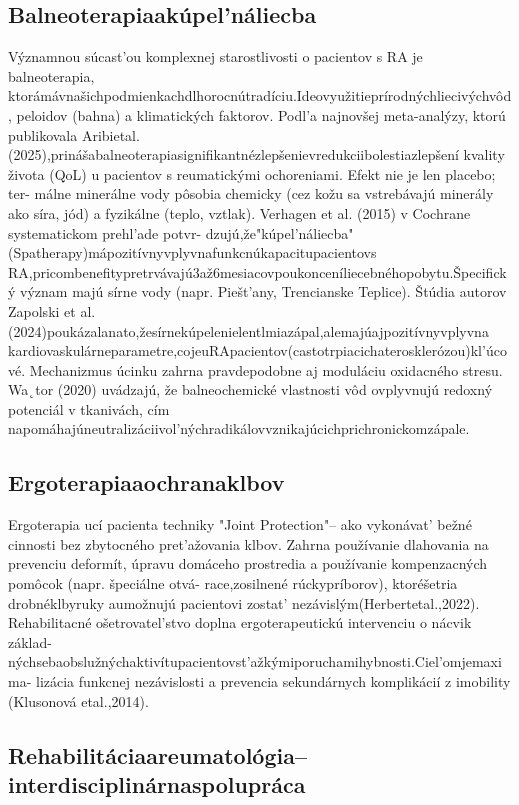 \subsection{Balneoterapiaakúpel’náliecba}

Významnou súcast’ou komplexnej starostlivosti o pacientov s RA je balneoterapia, ktorámávnašichpodmienkachdlhorocnútradíciu.Ideovyužitieprírodnýchliecivýchvôd, peloidov (bahna) a klimatických faktorov. Podl’a najnovšej meta-analýzy, ktorú publikovala Aribietal.(2025),prinášabalneoterapiasignifikantnézlepšenievredukciibolestiazlepšení kvality života (QoL) u pacientov s reumatickými ochoreniami. Efekt nie je len placebo; ter- málne minerálne vody pôsobia chemicky (cez kožu sa vstrebávajú minerály ako síra, jód) a fyzikálne (teplo, vztlak). Verhagen et al. (2015) v Cochrane systematickom prehl’ade potvr- dzujú,že"kúpel’náliecba"(Spatherapy)mápozitívnyvplyvnafunkcnúkapacitupacientovs RA,pricombenefitypretrvávajú3až6mesiacovpoukonceníliecebnéhopobytu.Špecifický význam majú sírne vody (napr. Piešt’any, Trencianske Teplice). Štúdia autorov Zapolski et al.(2024)poukázalanato,žesírnekúpelenielentlmiazápal,alemajúajpozitívnyvplyvna kardiovaskulárneparametre,cojeuRApacientov(castotrpiacichaterosklerózou)kl’úcové. Mechanizmus úcinku zahrna pravdepodobne aj moduláciu oxidacného stresu. Wa˛tor (2020) uvádzajú, že balneochemické vlastnosti vôd ovplyvnujú redoxný potenciál v tkanivách, cím napomáhajúneutralizáciivol’nýchradikálovvznikajúcichprichronickomzápale.


\subsection{Ergoterapiaaochranaklbov}

Ergoterapia ucí pacienta techniky "Joint Protection"-- ako vykonávat’ bežné cinnosti bez zbytocného pret’ažovania klbov. Zahrna používanie dlahovania na prevenciu deformít, úpravu domáceho prostredia a používanie kompenzacných pomôcok (napr. špeciálne otvá- race,zosilnené rúckypríborov), ktoréšetria drobnéklbyruky aumožnujú pacientovi zostat’ nezávislým(Herbertetal.,2022). Rehabilitacné ošetrovatel’stvo doplna ergoterapeutickú intervenciu o nácvik základ- nýchsebaobslužnýchaktivítupacientovst’ažkýmiporuchamihybnosti.Ciel’omjemaxima- lizácia funkcnej nezávislosti a prevencia sekundárnych komplikácií z imobility (Klusonová etal.,2014).


\subsection{Rehabilitáciaareumatológia--interdisciplinárnaspolupráca}

